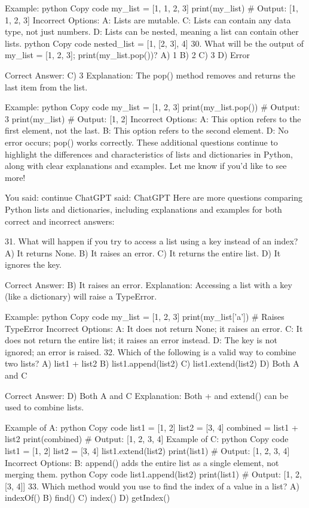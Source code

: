 Example:
python
Copy code
my_list = [1, 1, 2, 3]
print(my_list)  # Output: [1, 1, 2, 3]
Incorrect Options:
A: Lists are mutable.
C: Lists can contain any data type, not just numbers.
D: Lists can be nested, meaning a list can contain other lists.
python
Copy code
nested_list = [1, [2, 3], 4]
30. What will be the output of my_list = [1, 2, 3]; print(my_list.pop())?
A) 1
B) 2
C) 3
D) Error

Correct Answer: C) 3
Explanation: The pop() method removes and returns the last item from the list.

Example:
python
Copy code
my_list = [1, 2, 3]
print(my_list.pop())  # Output: 3
print(my_list)        # Output: [1, 2]
Incorrect Options:
A: This option refers to the first element, not the last.
B: This option refers to the second element.
D: No error occurs; pop() works correctly.
These additional questions continue to highlight the differences and characteristics of lists and dictionaries in Python, along with clear explanations and examples. Let me know if you'd like to see more!






You said:
continue
ChatGPT said:
ChatGPT
Here are more questions comparing Python lists and dictionaries, including explanations and examples for both correct and incorrect answers:

31. What will happen if you try to access a list using a key instead of an index?
A) It returns None.
B) It raises an error.
C) It returns the entire list.
D) It ignores the key.

Correct Answer: B) It raises an error.
Explanation: Accessing a list with a key (like a dictionary) will raise a TypeError.

Example:
python
Copy code
my_list = [1, 2, 3]
print(my_list['a'])  # Raises TypeError
Incorrect Options:
A: It does not return None; it raises an error.
C: It does not return the entire list; it raises an error instead.
D: The key is not ignored; an error is raised.
32. Which of the following is a valid way to combine two lists?
A) list1 + list2
B) list1.append(list2)
C) list1.extend(list2)
D) Both A and C

Correct Answer: D) Both A and C
Explanation: Both + and extend() can be used to combine lists.

Example of A:
python
Copy code
list1 = [1, 2]
list2 = [3, 4]
combined = list1 + list2
print(combined)  # Output: [1, 2, 3, 4]
Example of C:
python
Copy code
list1 = [1, 2]
list2 = [3, 4]
list1.extend(list2)
print(list1)  # Output: [1, 2, 3, 4]
Incorrect Options:
B: append() adds the entire list as a single element, not merging them.
python
Copy code
list1.append(list2)
print(list1)  # Output: [1, 2, [3, 4]]
33. Which method would you use to find the index of a value in a list?
A) indexOf()
B) find()
C) index()
D) getIndex()

